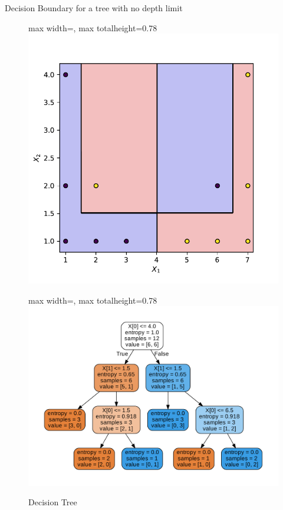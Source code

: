 \documentclass[aspectratio=169,10pt]{beamer}
\newcommand{\fitpic}[1]{\begin{adjustbox}{max width=\linewidth, max totalheight=0.78\textheight}#1\end{adjustbox}}
\begin{document}
	\begin{frame}{Decision Boundary for a tree with no depth limit}
	\begin{figure}[h]
	    \centering
	    \begin{minipage}{0.45\textwidth}
	        \centering
	        \fitpic{\includegraphics[width=\textwidth]{example-1-nolimit-boundary}}
	        \caption{Decision Boundary}
	    \end{minipage}
	    \hfill
	    \begin{minipage}{0.45\textwidth}
	        \centering
	        \fitpic{\includegraphics[width=\textwidth]{example-1-nolimit-decision-tree}}
	        \caption{Decision Tree}
	    \end{minipage}
	\end{figure}
	\end{frame}
	
\end{document}
